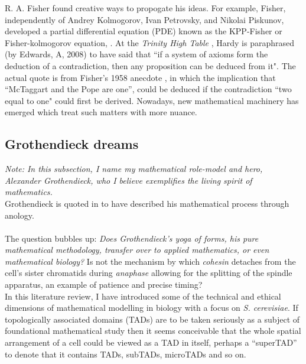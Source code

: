 R. A. Fisher found creative ways to propogate his ideas. 
For example, Fisher, independently of Andrey Kolmogorov, Ivan Petrovsky, and Nikolai Piskunov,
developed a partial differential equation (PDE) known as the KPP-Fisher or
Fisher-kolmogorov equation, \cite{fisher1937wave}. At the \textit{Trinity High Table}
, Hardy is paraphrased (by Edwards, A, 2008) to have said that ``if a system of axioms 
form the deduction of a contradiction, then any proposition can be deduced from it".
The actual quote is from Fisher's 1958 anecdote \cite{edwards2008gh}, 
in which the implication that ``McTaggart and the Pope are one'', 
could be deduced if the contradiction ``two equal to one" could first be derived. 
Nowadays, new mathematical machinery has emerged which 
treat such matters with more nuance.
\\

\subsection{Grothendieck dreams}

\textit{Note: In this subsection, I name my mathematical role-model and hero, \\
Alexander Grothendieck, who I believe exemplifies the living spirit of mathematics.}
\\

Grothendieck is quoted in \cite{mclarty2007rising} to have described 
his mathematical process through anology.
\\

\\

The question bubbles up: \textit{Does Grothendieck's \textit{yoga} of forms, 
his pure mathematical methodology,
transfer over to applied mathematics, or even mathematical biology?}
Is not the mechanism by which \textit{cohesin} detaches from the cell's sister 
chromatids during \textit{anaphase} allowing for the splitting of 
the spindle apparatus, an example of patience and precise timing?
\\

In this literature review, I have introduced some of the technical 
and ethical dimensions of mathematical modelling in biology with a focus
on \textit{S. cerevisiae}. If topologically associated domains (TADs)
are to be taken seriously as a subject of foundational mathematical study then it 
seems conceivable that the whole spatial arrangement of a cell could 
be viewed as a TAD in itself, perhaps a ``superTAD'' to denote 
that it contains TADs, subTADs, microTADs and so on.
\\

